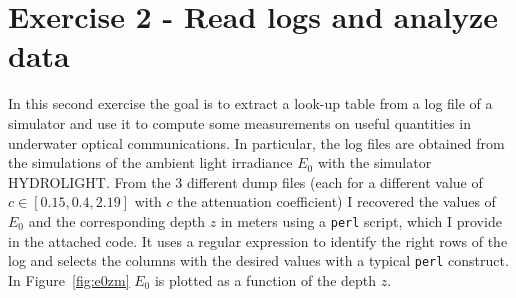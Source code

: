 \documentclass[10pt]{article}
\begin{document}
\begin{figure}[h!]
	\centering
\end{figure}



\section*{Exercise 2 - Read logs and analyze data}
In this second exercise the goal is to extract a look-up table from a log file of a simulator and use it to compute some measurements on useful quantities in underwater optical communications. In particular, the log files are obtained from the simulations of the ambient light irradiance $E_0$ with the simulator HYDROLIGHT. From the 3 different dump files (each for a different value of $c \in [0.15, 0.4, 2.19]$ with $c$ the attenuation coefficient) I recovered the values of $E_0$ and the corresponding depth $z$ in meters using a \texttt{perl} script, which I provide in the attached code. It uses a regular expression to identify the right rows of the log and selects the columns with the desired values with a typical \texttt{perl} construct. In Figure~\ref{fig:e0zm} $E_0$ is plotted as a function of the depth $z$.
\end{document}
